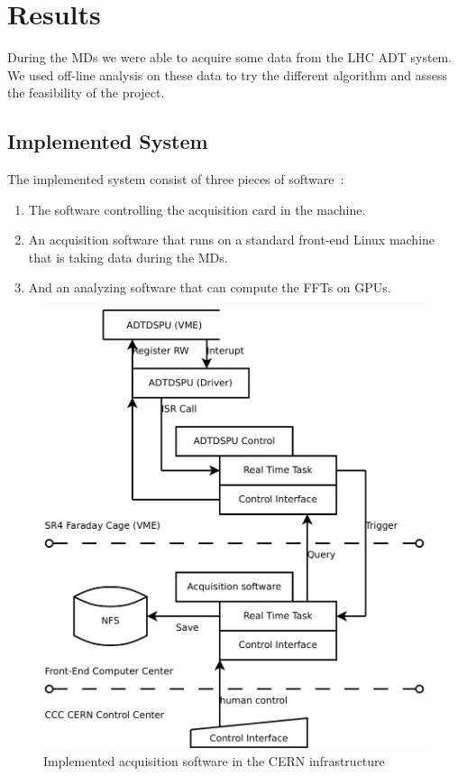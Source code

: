 %

\chapter{Results}

During the \glspl{MD} we were able to acquire some data from the \gls{LHC} \gls{ADT} system. We used off-line analysis on these data to try the different algorithm and assess the feasibility of the project.

\section{Implemented System}

The implemented system consist of three pieces of software~:
\begin{enumerate}
\item The software controlling the acquisition card in the machine.
\item An acquisition software that runs on a standard front-end Linux machine that is taking data during the \glspl{MD}.
\item And an analyzing software that can compute the \glspl{FFT} on \glspl{GPU}.
\end{enumerate}

\begin{figure}[H]
\caption{Implemented acquisition software in the CERN infrastructure}
\centering
\includegraphics[scale=0.3]{ImplementedSoftFesa.pdf}
\end{figure}

